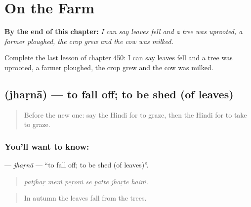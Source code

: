 
\chapter{On the Farm}
\label{ch:hi-on-the-farm}

\begin{chapteropening}
\textbf{By the end of this chapter:} \emph{I can say leaves fell and a tree was uprooted, a farmer ploughed, the crop grew and the cow was milked.}

Complete the last lesson of chapter 450: I can say leaves fell and a tree was uprooted, a farmer ploughed, the crop grew and the cow was milked.
\end{chapteropening}

\section[\texorpdfstring{\hi{झड़ना} (jhaṛnā)}{झड़ना (jhaṛnā)}]{ (jhaṛnā) — to fall off; to be shed (of leaves)}

\label{lesson:HI-C450-jharnaa}



\begin{quote}
Before the new one: say the Hindi for to graze, then the Hindi for to take to graze.
\end{quote}

\subsection*{You'll want to know: }
\textbf{} — \emph{jhaṛnā} — \textquotedblleft{}to fall off; to be shed (of leaves)\textquotedblright{}.

\begin{quote}
      
\end{quote}

\begin{quote}
\emph{patjhaṛ meṁ peṛoṁ se patte jhaṛte haiṁ.}
\end{quote}

\begin{quote}
In autumn the leaves fall from the trees.
\end{quote}

